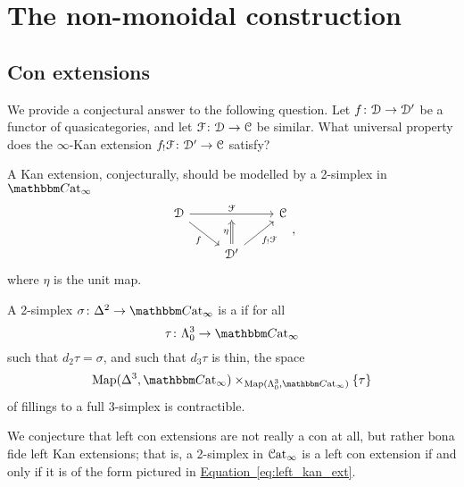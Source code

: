 \documentclass[main.tex]{subfiles}
\begin{document}
\section{The non-monoidal construction}
\label{sec:the_non_monoidal_construction}

\subsection{Con extensions}
\label{ssc:con_extensions}

We provide a conjectural answer to the following question. Let $f\colon \mathcal{D} \to \mathcal{D}'$ be a functor of quasicategories, and let $\mathcal{F}\colon \mathcal{D} \to \mathcal{C}$ be similar. What universal property does the $\infty$-Kan extension $f_{!}\mathcal{F}\colon \mathcal{D}' \to \mathcal{C}$ satisfy?

A Kan extension, conjecturally, should be modelled by a 2-simplex in $\ICCat$
\begin{equation*}
  \label{eq:left_kan_ext}
  \begin{tikzcd}
    \category{D}
    \arrow[rr, "\mathcal{F}", ""{below, name=M}]
    \arrow[dr, swap, "f"]
    && \category{C}
    \\
    & \category{D}'
    \arrow[ur, swap, "f_{!}\mathcal{F}"]
    \arrow[to=M, Rightarrow, "\eta"]
  \end{tikzcd},
\end{equation*}
where $\eta$ is the unit map.

\begin{definition}
  \label{def:con_extension}
  A 2-simplex $\sigma\colon \Delta^{2} \to \ICCat$ is a  if for all
  \begin{equation*}
    \tau\colon \Lambda^{3}_{0} \to \ICCat
  \end{equation*}
  such that $d_{2}\tau = \sigma$, and such that $d_{3}\tau$ is thin, the space
  \begin{equation*}
    \Map(\Delta^{3}, \ICCat) \times_{\Map(\Lambda^{3}_{0}, \ICCat)} \{\tau\}
  \end{equation*}
  of fillings to a full 3-simplex is contractible.
\end{definition}

We conjecture that left con extensions are not really a con at all, but rather bona fide left Kan extensions; that is, a 2-simplex in $\mathcal{C}\mathrm{at}_{\infty}$ is a left con extension if and only if it is of the form pictured in \hyperref[eq:left_kan_ext]{Equation~\ref*{eq:left_kan_ext}}.
\end{document}

